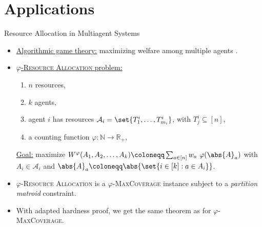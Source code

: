 \documentclass{beamer}
\theoremstyle{definition}
\theoremstyle{remark}
\begin{document}
\section{Applications}
\begin{frame}{Resource Allocation in Multiagent Systems}
  \begin{itemize}
  \item \underline{Algorithmic game theory:} maximizing welfare among multiple agents \cite{PM19}.
    
  \item \underline{$\varphi$-\textsc{Resource Allocation} problem:}
    \begin{enumerate}
    \item $n$ resources,
    \item $k$ agents,
    \item agent $i$ has resources $\mathcal{A}_i = \set{T^i_1, \ldots, T^i_{m_i}}$, with $T^i_j \subseteq [n]$,
    \item a counting function $\varphi: \mathbb{N} \rightarrow \mathbb{R}_+$,
    \end{enumerate}
    
    \underline{Goal:} maximize $W^{\varphi}(A_1, A_2, \ldots, A_k)  \coloneqq \sum_{a \in [n]} w_a \ \varphi(\abs{A}_a)$ with  $A_i \in \mathcal{A}_i$ and $\abs{A}_a \coloneqq  \abs{\set{i \in [k] : a \in A_i}}$.

    \pause
    \bigskip
  \item $\varphi$-\textsc{Resource Allocation} is a $\varphi$-\textsc{MaxCoverage} instance subject to a \emph{partition matroid} constraint.
  \item With adapted hardness proof, we get the same theorem as for $\varphi$-\textsc{MaxCoverage}.
  \end{itemize}
\end{frame}
\end{document}
